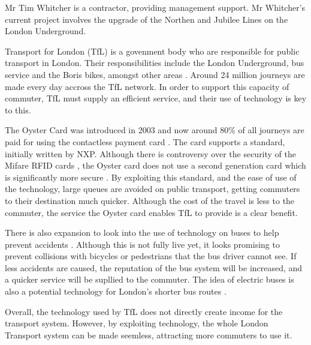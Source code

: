 {}

Mr Tim Whitcher is a contractor, providing management support.
Mr Whitcher's current project involves the upgrade of the Northen and Jubilee Lines on the London Underground. 

Transport for London (TfL) is a govenment body who are responsible for public transport in London.
Their responsibilities include the London Underground, bus service and the Boris bikes, amongst other areas \cite{tfl:about}.
Around 24 million journeys are made every day accross the TfL network.
In order to support this capacity of commuter, TfL must supply an efficient service, and their use of technology is key to this.

The Oyster Card was introduced in 2003 and now around 80\% of all journeys are paid for using the contactless payment card \cite{oyster:wiki}. 
The card supports a standard, initially written by NXP. 
Although there is controversy over the security of the Mifare RFID cards \cite{molnar2004privacy}, the Oyster card does not use a second generation card which is significantly more secure \cite{rfid:security}. 
By exploiting this standard, and the ease of use of the technology, large queues are avoided on public transport, getting commuters to their destination much quicker. 
Although the cost of the travel is less to the commuter, the service the Oyster card enables TfL to provide is a clear benefit.

There is also expansion to look into the use of technology on buses to help prevent accidents \cite{tfl:bus}. 
Although this is not fully live yet, it looks promising to prevent collisions with bicycles or pedestrians that the bus driver cannot see.
If less accidents are caused, the reputation of the bus system will be increased, and a quicker service will be supllied to the commuter.
The idea of electric buses is also a potential technology for London's shorter bus routes \cite{guardian:bus}.

Overall, the technology used by TfL does not directly create income for the transport system.
However, by exploiting technology, the whole London Transport system can be made seemless, attracting more commuters to use it.
